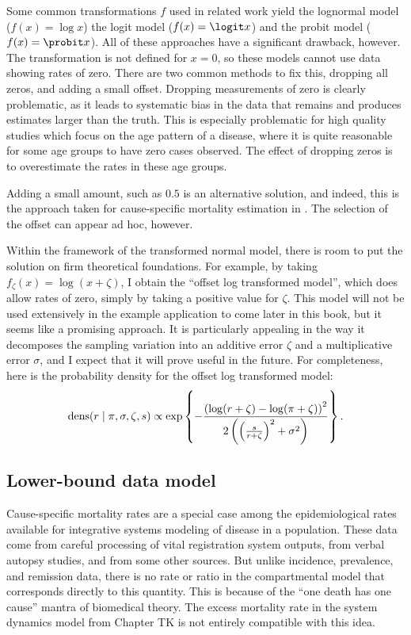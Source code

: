 Some common transformations $f$ used in related work yield the
lognormal model ($f(x) = \log x$) the logit model ($f(x) = \logit x$)
and the probit model ($f(x) = \probit x$).  All of these approaches
have a significant drawback, however.  The transformation is not
defined for $x=0$, so these models cannot use data showing rates of
zero. There are two common methods to fix this, dropping all zeros,
and adding a small offset.  Dropping measurements of zero is clearly
problematic, as it leads to systematic bias in the data that remains
and produces estimates larger than the truth.  This is especially
problematic for high quality studies which focus on the age pattern of
a disease, where it is quite reasonable for some age groups to have
zero cases observed.  The effect of dropping zeros is to overestimate
the rates in these age groups.

Adding a small amount, such as $0.5$ is an alternative solution, and
indeed, this is the approach taken for cause-specific mortality
estimation in \cite{Girotsis King-Demographic Forecasting}.  The
selection of the offset can appear ad hoc, however.

Within the framework of the transformed normal model, there is room to
put the solution on firm theoretical foundations.  For example, by
taking $f_\zeta(x) = \log(x + \zeta)$, I obtain the ``offset log
transformed model'', which does allow rates of zero, simply by taking
a positive value for $\zeta$.  This model will not be used extensively
in the example application to come later in this book, but it seems
like a promising approach.  It is particularly appealing in the way it
decomposes the sampling variation into an additive error $\zeta$ and a
multiplicative error $\sigma$, and I expect that it will prove useful
in the future.  For completeness, here is the probability density for
the offset log transformed model:
\[
\operatorname{dens}(r\;|\; \pi, \sigma,\zeta, s)
\propto \exp\left\{
-\frac{\left(\log(r+\zeta)-\log(\pi+\zeta)\right)^2}
      {2\left(\left(\frac{s}{r+\zeta}\right)^2+\sigma^2\right)}
\right\}.
\]

\subsection{Lower-bound data model}
Cause-specific mortality rates are a special case among the
epidemiological rates available for integrative systems modeling of
disease in a population.  These data come from careful processing of
vital registration system outputs, from verbal autopsy studies, and
from some other sources. But unlike incidence, prevalence, and
remission data, there is no rate or ratio in the compartmental model
that corresponds directly to this quantity.  This is because of the
``one death has one cause'' mantra of biomedical theory.  The excess
mortality rate in the system dynamics model from Chapter TK is not
entirely compatible with this idea.

